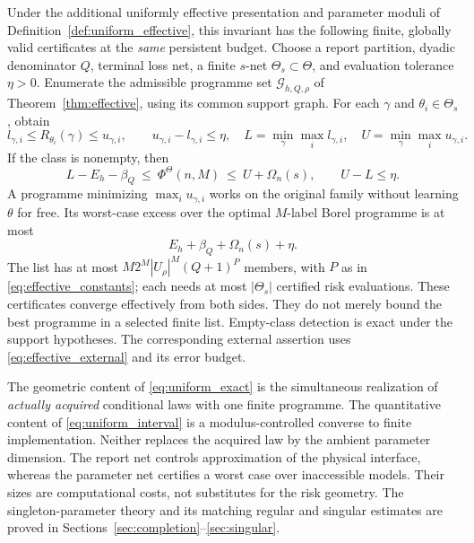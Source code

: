 \begin{theorem}
Under the additional uniformly effective presentation and parameter moduli of Definition~\ref{def:uniform_effective}, this invariant has the following finite, globally valid certificates at the \emph{same} persistent budget. Choose a report partition, dyadic denominator $Q$, terminal loss net, a finite $s$-net $\Theta_s\subset\Theta$, and evaluation tolerance $\eta>0$. Enumerate the admissible programme set $\mathscr G_{h,Q,\rho}$ of Theorem~\ref{thm:effective}, using its common support graph. For each $\gamma$ and $\theta_i\in\Theta_s$, obtain
\[
 l_{\gamma,i}\le R_{\theta_i}(\gamma)\le u_{\gamma,i},\qquad u_{\gamma,i}-l_{\gamma,i}\le\eta,
 \quad L=\min_\gamma\max_i l_{\gamma,i},\quad U=\min_\gamma\max_i u_{\gamma,i}.
\]
If the class is nonempty, then
\begin{equation}\label{eq:uniform_interval}
 \boxed{\quad L-E_h-\beta_Q\ \le\ \Phi^\Theta(n,M)\ \le\ U+\Omega_n(s),
       \qquad U-L\le\eta.\quad}
\end{equation}
A programme minimizing $\max_i u_{\gamma,i}$ works on the original family without learning $\theta$ for free. Its worst-case excess over the optimal $M$-label Borel programme is at most
\begin{equation}\label{eq:uniform_gap}
                  E_h+\beta_Q+\Omega_n(s)+\eta.
\end{equation}
The list has at most $M2^M|U_\rho|^M(Q+1)^P$ members, with $P$ as in \eqref{eq:effective_constants}; each needs at most $|\Theta_s|$ certified risk evaluations. These certificates converge effectively from both sides. They do not merely bound the best programme in a selected finite list. Empty-class detection is exact under the support hypotheses. The corresponding external assertion uses \eqref{eq:effective_external} and its error budget.
\end{theorem}

The geometric content of \eqref{eq:uniform_exact} is the simultaneous realization of \emph{actually acquired} conditional laws with one finite programme. The quantitative content of \eqref{eq:uniform_interval} is a modulus-controlled converse to finite implementation. Neither replaces the acquired law by the ambient parameter dimension. The report net controls approximation of the physical interface, whereas the parameter net certifies a worst case over inaccessible models. Their sizes are computational costs, not substitutes for the risk geometry. The singleton-parameter theory and its matching regular and singular estimates are proved in Sections~\ref{sec:completion}--\ref{sec:singular}.


